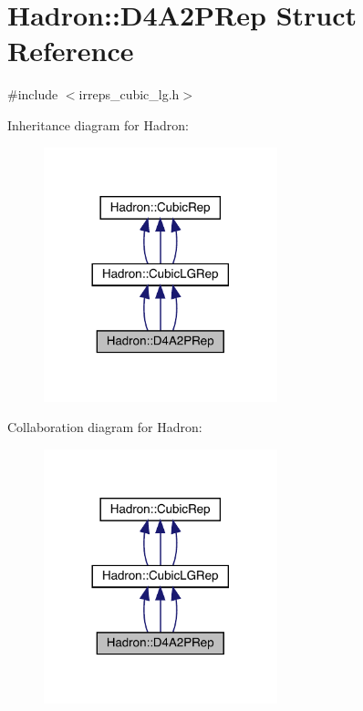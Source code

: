 \hypertarget{structHadron_1_1D4A2PRep}{}\section{Hadron\+:\+:D4\+A2\+P\+Rep Struct Reference}
\label{structHadron_1_1D4A2PRep}


{\ttfamily \#include $<$irreps\+\_\+cubic\+\_\+lg.\+h$>$}



Inheritance diagram for Hadron\+:
\nopagebreak
\begin{figure}[H]
\begin{center}
\leavevmode
\includegraphics[width=192pt]{d4/d48/structHadron_1_1D4A2PRep__inherit__graph}
\end{center}
\end{figure}


Collaboration diagram for Hadron\+:
\nopagebreak
\begin{figure}[H]
\begin{center}
\leavevmode
\includegraphics[width=192pt]{df/d72/structHadron_1_1D4A2PRep__coll__graph}
\end{center}
\end{figure}
